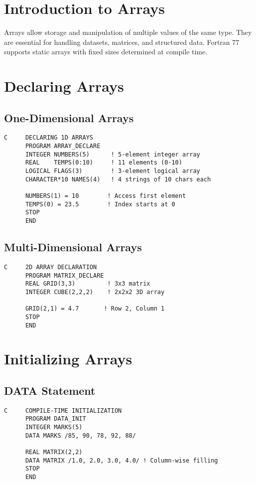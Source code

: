 \documentclass{book}
\begin{document}
\section*{Introduction to Arrays}
Arrays allow storage and manipulation of multiple values of the same type. They are essential for handling datasets, matrices, and structured data. Fortran 77 supports static arrays with fixed sizes determined at compile time.

\section*{Declaring Arrays}
\subsection*{One-Dimensional Arrays}
\begin{verbatim}
C     DECLARING 1D ARRAYS
      PROGRAM ARRAY_DECLARE
      INTEGER NUMBERS(5)      ! 5-element integer array
      REAL    TEMPS(0:10)     ! 11 elements (0-10)
      LOGICAL FLAGS(3)        ! 3-element logical array
      CHARACTER*10 NAMES(4)   ! 4 strings of 10 chars each
      
      NUMBERS(1) = 10        ! Access first element
      TEMPS(0) = 23.5        ! Index starts at 0
      STOP
      END
\end{verbatim}

\subsection*{Multi-Dimensional Arrays}
\begin{verbatim}
C     2D ARRAY DECLARATION
      PROGRAM MATRIX_DECLARE
      REAL GRID(3,3)         ! 3x3 matrix
      INTEGER CUBE(2,2,2)    ! 2x2x2 3D array
      
      GRID(2,1) = 4.7       ! Row 2, Column 1
      STOP
      END
\end{verbatim}

\section*{Initializing Arrays}
\subsection*{DATA Statement}
\begin{verbatim}
C     COMPILE-TIME INITIALIZATION
      PROGRAM DATA_INIT
      INTEGER MARKS(5)
      DATA MARKS /85, 90, 78, 92, 88/
      
      REAL MATRIX(2,2)
      DATA MATRIX /1.0, 2.0, 3.0, 4.0/ ! Column-wise filling
      STOP
      END
\end{verbatim}
\end{document}

